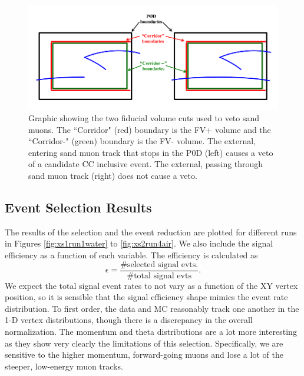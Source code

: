 \begin{figure}[h]
\centering
\includegraphics[width=6in]{Figures/smveto.png}
\caption{Graphic showing the two fiducial volume cuts used to veto sand muons. The ``Corridor" (red) boundary is the FV+ volume and the ``Corridor-" (green) boundary is the FV- volume. The external, entering sand muon track that stops in the P0D (left) causes a veto of a candidate CC inclusive event. The external, passing through sand muon track (right) does not cause a veto.}
\label{fig:smveto}
\end{figure}


\subsection{Event Selection Results}
\label{sec:selresults}

The results of the selection and the event reduction are plotted for different runs in Figures \ref{fig:xs1run1water} to \ref{fig:xs2run4air}. We also include the signal efficiency as a function of each variable. The efficiency is calculated as
\begin{equation}
\epsilon = \frac{\text{\# selected signal evts.}}{\text{\# total signal evts}}.
\end{equation}
\noindent We expect the total signal event rates to not vary as a function of the XY vertex position, so it is sensible that the signal efficiency shape mimics the event rate distribution. To first order, the data and MC reasonably track one another in the 1-D vertex distributions, though there is a discrepancy in the overall normalization. The momentum and theta distributions are a lot more interesting as they show very clearly the limitations of this selection. Specifically, we are sensitive to the higher momentum, forward-going muons and lose a lot of the steeper, low-energy muon tracks. 

